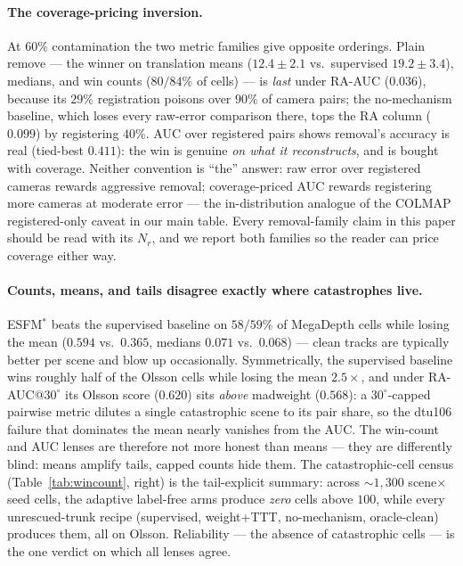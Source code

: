 \documentclass{article}
\newcommand{\mad}{madweight}
\begin{document}
\paragraph{The coverage-pricing inversion.} At $60\%$ contamination the two metric
families give opposite orderings. Plain remove --- the winner on translation means
($12.4\pm2.1$ vs.\ supervised $19.2\pm3.4$), medians, and win counts ($80/84\%$ of
cells) --- is \emph{last} under RA-AUC ($0.036$), because its $29\%$ registration
poisons over $90\%$ of camera pairs; the no-mechanism baseline, which loses every
raw-error comparison there, tops the RA column ($0.099$) by registering $40\%$.
AUC over registered pairs shows removal's accuracy is real (tied-best $0.411$): the
win is genuine \emph{on what it reconstructs}, and is bought with coverage. Neither
convention is ``the'' answer: raw error over registered cameras rewards aggressive
removal; coverage-priced AUC rewards registering more cameras at moderate error ---
the in-distribution analogue of the COLMAP registered-only caveat in our main table.
Every removal-family claim in this paper should be read with its $N_r$, and we
report both families so the reader can price coverage either way.

\paragraph{Counts, means, and tails disagree exactly where catastrophes live.}
ESFM$^{\ast}$ beats the supervised baseline on $58/59\%$ of MegaDepth cells while
losing the mean ($0.594$ vs.\ $0.365$, medians $0.071$ vs.\ $0.068$) --- clean tracks
are typically better per scene and blow up occasionally. Symmetrically, the supervised
baseline wins roughly half of the Olsson cells while losing the mean $2.5\times$, and
under RA-AUC@$30^{\circ}$ its Olsson score ($0.620$) sits \emph{above} \mad{}
($0.568$): a $30^{\circ}$-capped pairwise metric dilutes a single catastrophic scene
to its pair share, so the dtu106 failure that dominates the mean nearly vanishes from
the AUC. The win-count and AUC lenses are therefore not more honest than means ---
they are differently blind: means amplify tails, capped counts hide them. The
catastrophic-cell census (Table~\ref{tab:wincount}, right) is the tail-explicit
summary: across ${\sim}1{,}300$ scene$\times$seed cells, the adaptive label-free arms
produce \emph{zero} cells above $100$, while every unrescued-trunk recipe (supervised,
weight+TTT, no-mechanism, oracle-clean) produces them, all on Olsson. Reliability ---
the absence of catastrophic cells --- is the one verdict on which all lenses agree.
\end{document}
